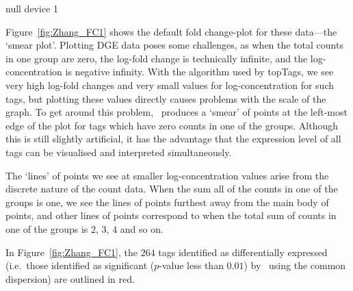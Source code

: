 \begin{Schunk}
\begin{Soutput}
null device 
          1 
\end{Soutput}
\end{Schunk}

Figure~\ref{fig:Zhang_FC1} shows the default fold change-plot for
these data---the `smear plot'. Plotting DGE data poses some
challenges, as when the total counts in one group are zero, the
log-fold change is technically infinite, and the log-concentration is
negative infinity. With the algorithm used by topTags, we see very
high log-fold changes and very small values for log-concentration for
such tags, but plotting these values directly causes problems with the
scale of the graph. To get around this problem, \edgeR~produces a
`smear' of points at the left-most edge of the plot for tags which
have zero counts in one of the groups. Although this is still slightly
artificial, it has the advantage that the expression level of all tags
can be visualised and interpreted simultaneously.

The `lines' of points we see at smaller log-concentration values arise
from the discrete nature of the count data. When the sum all of the
counts in one of the groups is one, we see the lines of points
furthest away from the main body of points, and other lines of points
correspond to when the total sum of counts in one of the groups is
$2$, $3$, $4$ and so on.

In Figure~\ref{fig:Zhang_FC1}, the $264$ tags identified as
differentially expressed (i.e.~those identified as significant
($p$-value less than $0.01$) by \edgeR~using the common dispersion)
are outlined in red.

